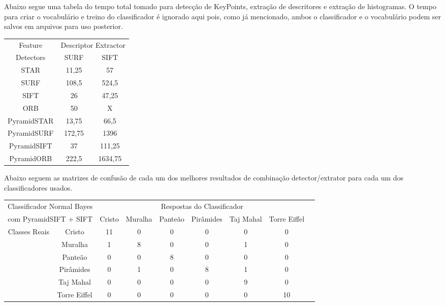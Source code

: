\documentclass[a4paper,11pt]{article}
\begin{document}
  Abaixo segue uma tabela do tempo total tomado para detecção de KeyPoints,
  extração de descritores e extração de histogramas. O tempo para criar o
  vocabulário e treino do classificador é ignorado aqui pois, como já
  mencionado, ambos o classificador e o vocabulário podem ser salvos em arquivos
  para uso posterior.

  \vspace{15pt}
  \hspace{65pt}
  \begin{tabular}{|c|c|c|}
    \hline
    Feature &  \multicolumn{2}{|c|}{Descriptor Extractor} \\
    \cline{2-3}
     Detectors & SURF & SIFT \\
    \hline
    STAR & 11,25 & 57 \\
    SURF & 108,5 & 524,5 \\
    SIFT  & 26 & 47,25 \\
    ORB  & 50 & X \\
    PyramidSTAR & 13,75 & 66,5 \\
    PyramidSURF & 172,75 & 1396 \\
    PyramidSIFT & 37 & 111,25 \\
    PyramidORB & 222,5 & 1634,75 \\
    \hline
  \end{tabular}
  \vspace{15pt}

  Abaixo seguem as matrizes de confusão de cada um dos melhores resultados de
  combinação detector/extrator para cada um dos classificadores usados.

  \vspace{15pt}
  \hspace{-75pt}
  \begin{tabular}{|cc|c|c|c|c|c|c|c|}
    \hline
    \multicolumn{2}{|c|}{Classificador Normal Bayes} &
    \multicolumn{6}{|c|}{Respostas do Classificador} \\
    \cline{3-8}
    \multicolumn{2}{|c|}{com PyramidSIFT + SIFT}
    & Cristo & Muralha & Panteão & Pirâmides & Taj Mahal & Torre Eiffel \\
    \hline
    \multirow{6}{*}{Classes Reais}
    & \multicolumn{1}{|c|}{Cristo} & 11 & 0 & 0 & 0 & 0 & 0 \\
    \cline{2-8}
    & \multicolumn{1}{|c|}{Muralha} & 1 & 8 & 0 & 0 & 1 & 0\\
    \cline{2-8}
    & \multicolumn{1}{|c|}{Panteão} & 0 & 0 & 8 & 0 & 0 & 0\\
    \cline{2-8}
    & \multicolumn{1}{|c|}{Pirâmides} & 0 & 1 & 0 & 8 & 1 & 0\\
    \cline{2-8}
    & \multicolumn{1}{|c|}{Taj Mahal} & 0 & 0 & 0 & 0 & 9 & 0\\
    \cline{2-8}
    & \multicolumn{1}{|c|}{Torre Eiffel} & 0 & 0 & 0 & 0 & 0 & 10\\
    \hline
  \end{tabular}
  \bigskip
  
\end{document}
